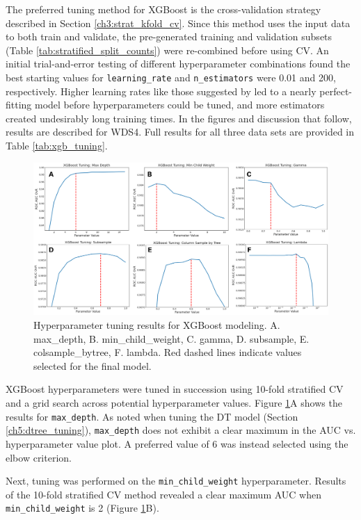 The preferred tuning method for XGBoost is the cross-validation strategy described in Section \ref{ch3:strat_kfold_cv}. Since this method uses the input data to both train and validate, the pre-generated training and validation subsets (Table \ref{tab:stratified_split_counts}) were re-combined before using CV. An initial trial-and-error testing of different hyperparameter combinations found the best starting values for \verb|learning_rate| and \verb|n_estimators| were 0.01 and 200, respectively. Higher learning rates like those suggested by \citet{jain_xgboost_2016} led to a nearly perfect-fitting model before hyperparameters could be tuned, and more estimators created undesirably long training times. In the figures and discussion that follow, results are described for WDS4. Full results for all three data sets are provided in Table \ref{tab:xgb_tuning}.

\begin{figure}[!htp]
\centering
\includegraphics[width=\textwidth]{templates/images/Figure-XGB_Hyperparameters.png}
\caption[XGBoost hyperparameter tuning]{Hyperparameter tuning results for XGBoost modeling. A. max\_depth, B. min\_child\_weight, C. gamma, D. subsample, E. colsample\_bytree, F. lambda. Red dashed lines indicate values selected for the final model.}
\label{fig:xgb_hyperparam}
\end{figure}

XGBoost hyperparameters were tuned in succession using 10-fold stratified CV and a grid search across potential hyperparameter values. Figure \ref{fig:xgb_hyperparam}A shows the results for \verb|max_depth|. As noted when tuning the DT model (Section \ref{ch5:dtree_tuning}), \verb|max_depth| does not exhibit a clear maximum in the AUC vs. hyperparameter value plot. A preferred value of 6 was instead selected using the elbow criterion.

Next, tuning was performed on the \verb|min_child_weight| hyperparameter. Results of the 10-fold stratified CV method revealed a clear maximum AUC when \verb|min_child_weight| is 2 (Figure \ref{fig:xgb_hyperparam}B).

